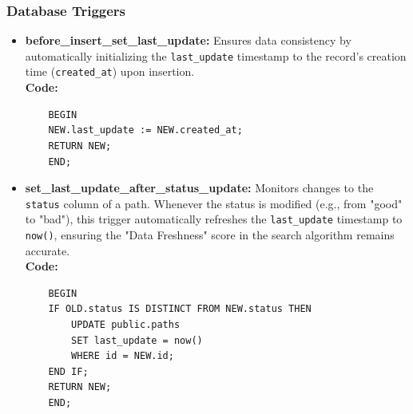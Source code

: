 \subsubsection{Database Triggers}
\begin{itemize}
    \item \textbf{before\_insert\_set\_last\_update:} 
    Ensures data consistency by automatically initializing the \texttt{last\_update} timestamp to the record's creation time (\texttt{created\_at}) upon insertion. \\
    \textbf{Code:}
    \begin{lstlisting}
    BEGIN
    NEW.last_update := NEW.created_at;
    RETURN NEW;
    END;
    \end{lstlisting}

    \item \textbf{set\_last\_update\_after\_status\_update:} 
    Monitors changes to the \texttt{status} column of a path. Whenever the status is modified (e.g., from "good" to "bad"), this trigger automatically refreshes the \texttt{last\_update} timestamp to \texttt{now()}, ensuring the "Data Freshness" score in the search algorithm remains accurate. \\
    \textbf{Code:}
    \begin{lstlisting}
    BEGIN
    IF OLD.status IS DISTINCT FROM NEW.status THEN
        UPDATE public.paths
        SET last_update = now()
        WHERE id = NEW.id;
    END IF;
    RETURN NEW;
    END;
    \end{lstlisting}
\end{itemize}